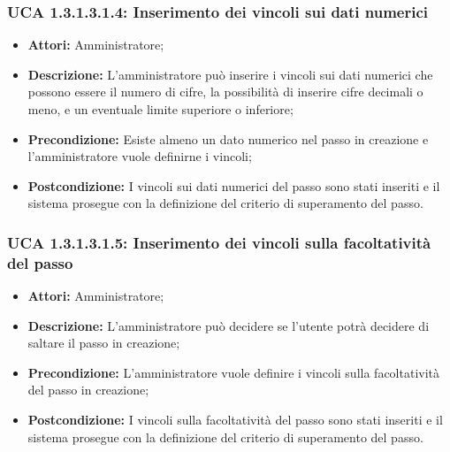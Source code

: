 \subsubsection{UCA 1.3.1.3.1.4: Inserimento dei vincoli sui dati numerici}
\begin{itemize}
\item \textbf{Attori:}
 Amministratore;
\item \textbf{Descrizione:} 
L'amministratore può inserire i vincoli sui dati numerici che possono essere il numero di cifre, la possibilità di inserire cifre decimali o meno, e un eventuale limite superiore o inferiore;
\item \textbf{Precondizione:} 
Esiste almeno un dato numerico nel passo in creazione e l'amministratore vuole definirne i vincoli;
\item \textbf{Postcondizione:} 
I vincoli sui dati numerici del passo sono stati inseriti e il sistema prosegue con la definizione del criterio di superamento del passo.
\end{itemize}

\hypertarget{A1.3.1.3.1.5}{}
\subsubsection{UCA 1.3.1.3.1.5: Inserimento dei vincoli sulla facoltatività del passo}
\begin{itemize}
\item \textbf{Attori:}
 Amministratore;
\item \textbf{Descrizione:} 
L'amministratore può decidere se l'utente potrà decidere di saltare il passo in creazione;
\item \textbf{Precondizione:} 
L'amministratore vuole definire i vincoli sulla facoltatività del passo in creazione;
\item \textbf{Postcondizione:} 
I vincoli sulla facoltatività del passo sono stati inseriti e il sistema prosegue con la definizione del criterio di superamento del passo.
\end{itemize}

\hypertarget{A1.3.1.3.2}{}
